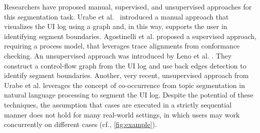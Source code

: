 Researchers have proposed manual, supervised, and unsupervised approaches for this segmentation task. Urabe et al.~\cite{urabe2019visualizing} introduced a manual approach that visualizes the UI log using a graph and, in this way, supports the user in identifying segment boundaries. Agostinelli et al. \cite{agostinelli202111} proposed a supervised approach, requiring a process model, that leverages trace alignments from conformance checking. 
An unsupervised approach was introduced by Leno et al. \cite{leno2020identifying}. They construct a control-flow graph from the UI log and use back edges detection to identify segment boundaries. Another, very recent, unsupervised approach from Urabe et al. \cite{Urabe21} leverages the concept of co-occurrence from topic segmentation in natural language processing to segment the UI log. Despite the potential of these techniques, 
the assumption that cases are executed in a strictly sequential manner does not hold for many real-world settings, in which users may work concurrently on different cases (cf., \autoref{fig:example}).


